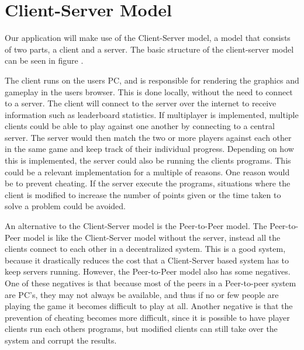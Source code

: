 \section{Client-Server Model}
Our application will make use of the Client-Server model, a model that consists of two parts, a client and a server. The basic structure of the client-server model can be seen in figure .


The client runs on the users PC, and is responsible for rendering the graphics and gameplay in the users browser.
This is done locally, without the need to connect to a server. The client will connect to the server over the internet to receive information such as leaderboard statistics. If multiplayer is implemented, multiple clients could be able to play against one another by connecting to a central server. The server would then match the two or more players against each other in the same game and keep track of their individual progress. Depending on how this is implemented, the server could also be running the clients programs. This could be a relevant implementation for a multiple of reasons. One reason would be to prevent cheating. If the server execute the programs, situations where the client is modified to increase the number of points given or the time taken to solve a problem could be avoided.

An alternative to the Client-Server model is the Peer-to-Peer model. The Peer-to-Peer model is like the Client-Server model without the server, instead all the clients connect to each other in a decentralized system. This is a good system, because it drastically reduces the cost that a Client-Server based system has to keep servers running. However, the Peer-to-Peer model also has some negatives. One of these negatives is that because most of the peers in a Peer-to-peer system are PC's, they may not always be available, and thus if no or few people are playing the game it becomes difficult to play at all. Another negative is that the prevention of cheating becomes more difficult, since it is possible to have player clients run each others programs, but modified clients can still take over the system and corrupt the results.